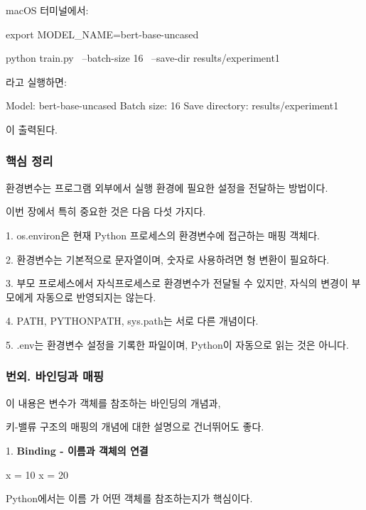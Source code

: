 macOS 터미널에서:

\begin{dhkzsh}
export MODEL_NAME=bert-base-uncased

python train.py \
    --batch-size 16 \
    --save-dir results/experiment1
\end{dhkzsh}

라고 실행하면:

\begin{dhkzsh}
Model: bert-base-uncased
Batch size: 16
Save directory: results/experiment1
\end{dhkzsh}

이 출력된다.

\subsubsection{핵심 정리}

환경변수는 프로그램 외부에서 실행 환경에 필요한 설정을 전달하는 방법이다.

이번 장에서 특히 중요한 것은 다음 다섯 가지다.

\begin{dhksmry}
    1. os.environ은 현재 Python 프로세스의 
        환경변수에 접근하는 매핑 객체다.


    2. 환경변수는 기본적으로 문자열이며, 
        숫자로 사용하려면 형 변환이 필요하다.


    3. 부모 프로세스에서 자식프로세스로 환경변수가 전달될 수 있지만,
        자식의 변경이 부모에게 자동으로 반영되지는 않는다.


    4. PATH, PYTHONPATH, sys.path는 서로 다른 개념이다.


    5. .env는 환경변수 설정을 기록한 파일이며,
        Python이 자동으로 읽는 것은 아니다.
\end{dhksmry}

\subsubsection{번외. 바인딩과 매핑}

이 내용은 변수가 객체를 참조하는 바인딩의 개념과,

키-밸류 구조의 매핑의 개념에 대한 설명으로 건너뛰어도 좋다.

1. \textbf{Binding - 이름과 객체의 연결}

\begin{dhkcode}
x = 10
x = 20
\end{dhkcode}

Python에서는 이름 가 어떤 객체를 참조하는지가 핵심이다.

